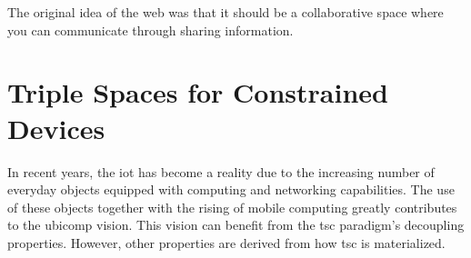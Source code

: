 
\begin{savequote}[50mm]
The original idea of the web was that it should be a collaborative space where you can communicate through sharing information.
\end{savequote}


\newcommand{\codigo}[1]{``\texttt{#1}''}
\newcommand{\primquery}{\emph{query}}
\newcommand{\primread}{\emph{read}}
\newcommand{\primtake}{\emph{take}}
\newcommand{\primwrite}{\emph{write}}

\newcommand{\coordspace}{\emph{coordination space}}
\newcommand{\outerspace}{\emph{outer space}}
\newcommand{\coordinator}{\emph{coordinator}}
\newcommand{\coordinators}{\emph{coordinators}}
\newcommand{\asteroids}{\emph{asteroids}}
\newcommand{\asteroid}{\emph{asteroid}}
\newcommand{\selfgraphs}{\emph{self-managed graphs}}
\newcommand{\osapi}{\emph{OSAPI}}


\chapter{Triple Spaces for Constrained Devices}
\label{cha:tsc}

\ifpdf
    \graphicspath{{\pathchapfour/figures/PNG/}{\pathchapfour/figures/PDF/}{\pathchapfour/figures/}}
\else
    \graphicspath{{\pathchapfour/figures/EPS/}{\pathchapfour/figures/}}
\fi









In recent years, the \acf{iot} has become a reality due to the increasing number of everyday objects equipped with computing and networking capabilities.
The use of these objects together with the rising of mobile computing greatly contributes to the \ac{ubicomp} vision.
This vision can benefit from the \acf{tsc} paradigm's decoupling properties. %
However, other properties are derived from how \ac{tsc} is materialized. %


